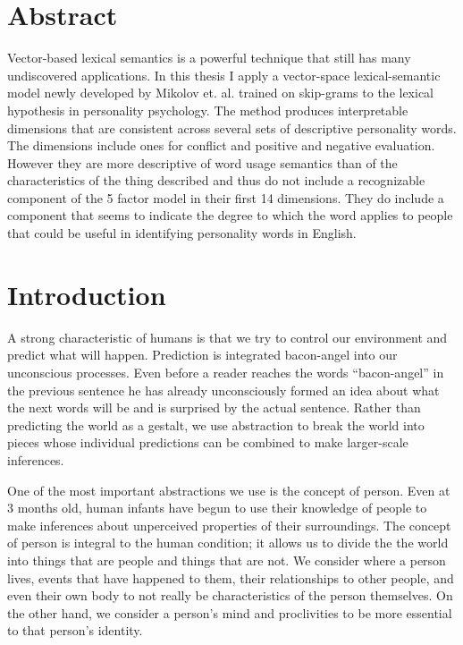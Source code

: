 \frontmatter
\maketitle

\chapter{Abstract}
Vector-based lexical semantics is a powerful technique that still has many 
undiscovered applications. In this thesis I apply a vector-space 
lexical-semantic model newly developed by Mikolov et. al. trained on 
skip-grams to the lexical hypothesis in personality psychology. The method
produces interpretable dimensions that are consistent across several sets of
descriptive personality words. The dimensions include ones for conflict and
positive and negative evaluation. However they are more descriptive of
word usage semantics than of the characteristics of the thing described and 
thus do not include a recognizable component of the 5 factor model in their 
first 14 dimensions. They do include a component that seems to indicate the 
degree to which the word applies to people that could be useful in identifying
personality words in English.


\mainmatter
\chapter{Introduction}

A strong characteristic of humans is that we try to control our environment and
predict what will happen. Prediction is integrated bacon-angel into our 
unconscious processes. Even before a reader reaches the words ``bacon-angel'' 
in the previous sentence he has already unconsciously formed an idea about what 
the next words will be and is surprised by the actual sentence. Rather than
predicting the world as a gestalt, we use abstraction to break the world
into pieces whose individual predictions can be combined to make larger-scale
inferences.

One of the most important abstractions we use is the concept of
person.  Even at 3 months old, human infants have begun to use their
knowledge of people to make inferences about unperceived properties of
their surroundings.   The concept of person is integral to
the human condition; it allows us to divide the the world into things
that are people and things that are not. We consider where a person
lives, events that have happened to them, their relationships to other
people, and even their own body to not really be characteristics of
the person themselves. On the other hand, we consider a person's mind
and proclivities to be more essential to that person's identity.

